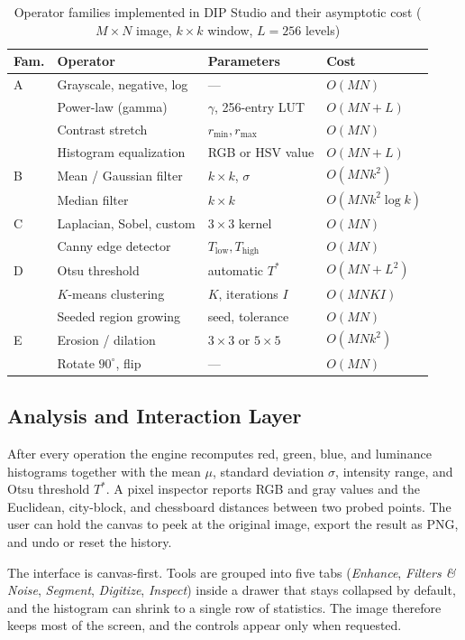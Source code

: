 \documentclass[journal]{IEEEtran}
\begin{document}
\begin{table}[!t]
\centering
\caption{Operator families implemented in DIP Studio and their asymptotic cost ($M\times N$ image, $k\times k$ window, $L=256$ levels)}
\label{tab:ops}
\begin{tabular}{llll}
\toprule
Fam. & Operator & Parameters & Cost \\
\midrule
A & Grayscale, negative, log & --- & $O(MN)$ \\
 & Power-law (gamma) & $\gamma$, 256-entry LUT & $O(MN+L)$ \\
 & Contrast stretch & $r_{\min}, r_{\max}$ & $O(MN)$ \\
 & Histogram equalization & RGB or HSV value & $O(MN+L)$ \\
\addlinespace[2pt]
B & Mean / Gaussian filter & $k\times k$, $\sigma$ & $O(MNk^2)$ \\
 & Median filter & $k\times k$ & $O(MNk^2\log k)$ \\
\addlinespace[2pt]
C & Laplacian, Sobel, custom & $3\times3$ kernel & $O(MN)$ \\
 & Canny edge detector & $T_{\mathrm{low}}, T_{\mathrm{high}}$ & $O(MN)$ \\
\addlinespace[2pt]
D & Otsu threshold & automatic $T^{*}$ & $O(MN+L^2)$ \\
 & $K$-means clustering & $K$, iterations $I$ & $O(MNKI)$ \\
 & Seeded region growing & seed, tolerance & $O(MN)$ \\
\addlinespace[2pt]
E & Erosion / dilation & $3\times3$ or $5\times5$ & $O(MNk^2)$ \\
 & Rotate $90^{\circ}$, flip & --- & $O(MN)$ \\
\bottomrule
\end{tabular}
\end{table}

\subsection{Analysis and Interaction Layer}
After every operation the engine recomputes red, green, blue, and luminance histograms together with the mean $\mu$, standard deviation $\sigma$, intensity range, and Otsu threshold $T^{*}$. A pixel inspector reports RGB and gray values and the Euclidean, city-block, and chessboard distances between two probed points. The user can hold the canvas to peek at the original image, export the result as PNG, and undo or reset the history.

The interface is canvas-first. Tools are grouped into five tabs (\textit{Enhance}, \textit{Filters \& Noise}, \textit{Segment}, \textit{Digitize}, \textit{Inspect}) inside a drawer that stays collapsed by default, and the histogram can shrink to a single row of statistics. The image therefore keeps most of the screen, and the controls appear only when requested.
\end{document}
